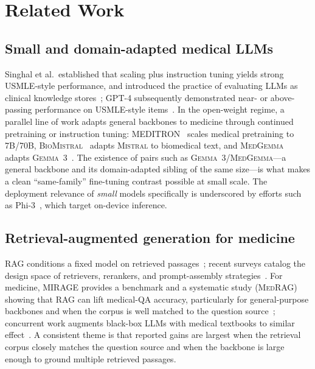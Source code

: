 \documentclass[11pt,a4paper]{article}
\begin{document}
\section{Related Work}

\subsection{Small and domain-adapted medical LLMs}
Singhal et al.\ established that scaling plus instruction tuning yields strong
USMLE-style performance, and introduced the practice of evaluating LLMs as
clinical knowledge stores~\cite{singhal2023medpalm}; \textsc{GPT-4} subsequently
demonstrated near- or above-passing performance on USMLE-style
items~\cite{nori2023gpt4medical}. In the open-weight regime, a parallel line of
work adapts general backbones to medicine through continued pretraining or
instruction tuning: \textsc{MEDITRON}~\cite{chen2023meditron} scales medical
pretraining to 7B/70B, \textsc{BioMistral}~\cite{labrak2024biomistral} adapts
\textsc{Mistral} to biomedical text, and \textsc{MedGemma}~\cite{sellergren2025medgemma}
adapts \textsc{Gemma~3}~\cite{team2024gemma}. The existence of pairs such as
\textsc{Gemma~3}/\textsc{MedGemma}---a general backbone and its domain-adapted
sibling of the same size---is what makes a clean ``same-family'' fine-tuning
contrast possible at small scale. The deployment relevance of \emph{small} models
specifically is underscored by efforts such as
Phi-3~\cite{abdin2024phi3}, which target on-device inference.

\subsection{Retrieval-augmented generation for medicine}
RAG conditions a fixed model on retrieved passages~\cite{lewis2020rag}; recent
surveys catalog the design space of retrievers, rerankers, and prompt-assembly
strategies~\cite{gao2023ragsurvey}. For medicine, \textsc{MIRAGE} provides a
benchmark and a systematic study (\textsc{MedRAG}) showing that RAG can lift
medical-QA accuracy, particularly for general-purpose backbones and when the
corpus is well matched to the question
source~\cite{xiong2024benchmarkingrag}; concurrent work augments black-box LLMs
with medical textbooks to similar effect~\cite{wang2024augmentingblackbox}. A
consistent theme is that reported gains are largest when the retrieval corpus
closely matches the question source and when the backbone is large enough to
ground multiple retrieved passages.
\end{document}
